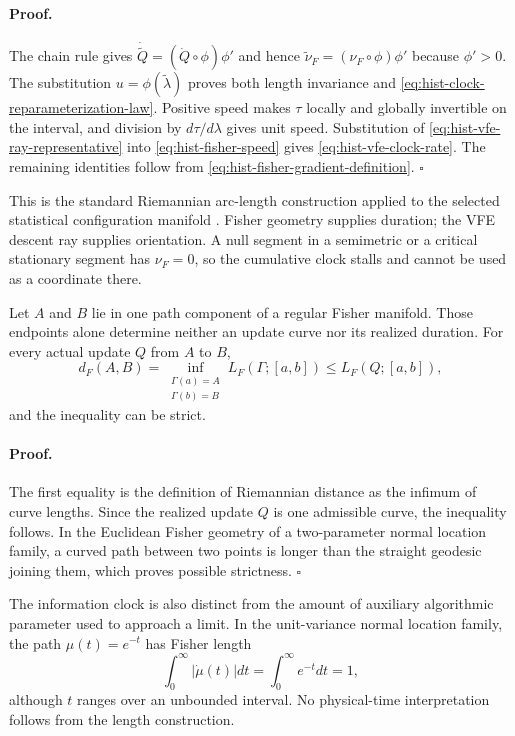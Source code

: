 \paragraph{Proof.}
The chain rule gives
$\dot{\widetilde Q}=(\dot Q\circ\phi)\phi'$ and hence
$\widetilde\nu_F=(\nu_F\circ\phi)\phi'$ because $\phi'>0$.
The substitution $u=\phi(\widetilde\lambda)$ proves both length invariance
and \eqref{eq:hist-clock-reparameterization-law}.  Positive speed makes
$\tau$ locally and globally invertible on the interval, and division by
$d\tau/d\lambda$ gives unit speed.  Substitution of
\eqref{eq:hist-vfe-ray-representative} into
\eqref{eq:hist-fisher-speed} gives
\eqref{eq:hist-vfe-clock-rate}.  The remaining identities follow from
\eqref{eq:hist-fisher-gradient-definition}.  $\square$

This is the standard Riemannian arc-length construction applied to the
selected statistical configuration manifold
\citep{AmariNagaoka2000,Pennec2006}.  Fisher geometry supplies duration;
the VFE descent ray supplies orientation.  A null segment in a semimetric or
a critical stationary segment has $\nu_F=0$, so the cumulative clock stalls
and cannot be used as a coordinate there.  

Let $A$ and $B$ lie in one path component of a regular Fisher manifold.
Those endpoints alone determine neither an update curve nor its realized
duration.  For every actual update $Q$ from $A$ to $B$,
\begin{equation}
d_F(A,B)
=\inf_{\substack{\Gamma(a)=A\\\Gamma(b)=B}}L_F(\Gamma;[a,b])
\leq L_F(Q;[a,b]),
\label{eq:hist-distance-versus-realized-length}
\end{equation}
and the inequality can be strict.  

\paragraph{Proof.}
The first equality is the definition of Riemannian distance as the infimum
of curve lengths.  Since the realized update $Q$ is one admissible curve,
the inequality follows.  In the Euclidean Fisher geometry of a two-parameter
normal location family, a curved path between two points is longer than the
straight geodesic joining them, which proves possible strictness.  $\square$

The information clock is also distinct from the amount of auxiliary
algorithmic parameter used to approach a limit.  In the unit-variance normal
location family, the path $\mu(t)=e^{-t}$ has Fisher length
\begin{equation}
\int_0^\infty |\dot\mu(t)|dt
=\int_0^\infty e^{-t}dt
=1,
\label{eq:hist-finite-length-infinite-parameter}
\end{equation}
although $t$ ranges over an unbounded interval.  No physical-time
interpretation follows from the length construction.  

